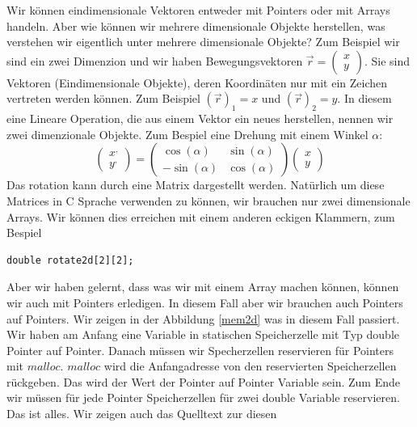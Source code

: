 \documentclass{article}[12pt]
\begin{document}
Wir können eindimensionale Vektoren entweder mit Pointers oder mit Arrays handeln.
Aber wie können wir mehrere dimensionale Objekte herstellen, was verstehen wir eigentlich 
unter 
mehrere dimensionale Objekte? Zum Beispiel wir sind ein zwei Dimenzion und wir haben 
Bewegungsvektoren $\vec{r}=\left(\begin{array}{c}x\\y\end{array}\right)$. Sie sind 
Vektoren (Eindimensionale Objekte), deren Koordinäten nur mit ein Zeichen vertreten werden
können. Zum Beispiel $\left(\vec{r}\right)_1=x$ und $\left(\vec{r}\right)_2=y$.
In diesem eine Lineare Operation, die aus einem Vektor ein neues herstellen, nennen
wir zwei dimenzionale Objekte. Zum Bespiel eine Drehung mit einem Winkel $\alpha$:
\begin{equation}
\left(\begin{array}{c}x^{,}\\y^{,}\end{array}\right)=
\left(\begin{array}{cc} \cos\left(\alpha\right) & \sin\left(\alpha\right) \\
                       -\sin\left(\alpha\right) & \cos\left(\alpha\right) 
\end{array}\right)
\left(\begin{array}{c}x\\y\end{array}\right)
\end{equation}
Das rotation kann durch eine Matrix dargestellt werden. Natürlich um diese Matrices
in C Sprache verwenden zu können, wir brauchen nur zwei dimensionale Arrays. Wir können
dies erreichen mit einem anderen eckigen Klammern, zum Bespiel 
\begin{lstlisting}
double rotate2d[2][2];
\end{lstlisting}
Aber wir haben gelernt, dass was wir mit einem Array machen können, können wir auch 
mit Pointers erledigen. In diesem Fall aber wir brauchen auch Pointers auf Pointers.
Wir zeigen in der Abbildung \ref{mem2d} was in diesem Fall passiert. Wir haben am Anfang 
eine Variable in statischen Speicherzelle mit Typ double Pointer auf Pointer.
Danach müssen wir Specherzellen reservieren für Pointers mit $malloc$. $malloc$ 
wird die Anfangadresse von den reservierten Speicherzellen rückgeben. Das wird der Wert
der Pointer auf Pointer Variable sein. Zum Ende wir müssen für jede Pointer Speicherzellen 
für zwei double Variable reservieren. Das ist alles. Wir zeigen auch das Quelltext zur diesen
\end{document}
